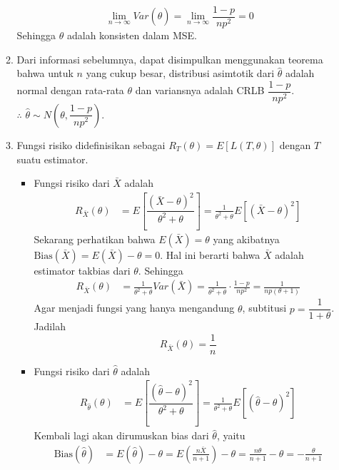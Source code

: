 \documentclass{exam}
\begin{document}
\begin{enumerate}
\begin{solution}
\begin{enumerate}
            \[\lim_{n\to\infty}Var(\hat{\theta}) = \lim_{n\to\infty}\frac{1-p}{np^2} = 0\]
            Sehingga $\hat{\theta}$ adalah konsisten dalam MSE.
            \item Dari informasi sebelumnya, dapat disimpulkan menggunakan teorema bahwa untuk $n$ yang cukup besar, distribusi asimtotik dari $\hat{\theta}$ adalah normal dengan rata-rata $\theta$ dan variansnya adalah CRLB $\dfrac{1-p}{np^2}$.\\
            $\therefore$ $\hat{\theta}\sim N\left(\theta,\dfrac{1-p}{np^2}\right)$.
            \item Fungsi risiko didefinisikan sebagai $R_{T}(\theta) = E\left[L(T,\theta)\right]$ dengan $T$ suatu estimator. 
            \begin{itemize}
                \item Fungsi risiko dari $\bar{X}$ adalah
                \begin{align*}
                    R_{\bar{X}}(\theta) &= E\left[\dfrac{(\bar{X}-\theta)^2}{\theta^2+\theta}\right] = \frac{1}{\theta^2+\theta}E\left[\left(\bar{X}-\theta\right)^2\right] 
                \end{align*}
                Sekarang perhatikan bahwa $E(\bar{X}) = \theta$ yang akibatnya $\text{Bias}(\bar{X}) = E(\bar{X}) - \theta = 0$. Hal ini berarti bahwa $\bar{X}$ adalah estimator takbias dari $\theta$. Sehingga
                \begin{align*}
                    R_{\bar{X}}(\theta) &= \frac{1}{\theta^2+\theta}Var(\bar{X}) = \frac{1}{\theta^2+\theta}\cdot\frac{1-p}{np^2}= \frac{1}{np(\theta+1)}
                \end{align*}
                Agar menjadi fungsi yang hanya mengandung $\theta$, subtitusi $p=\dfrac{1}{1+\theta}$. Jadilah
                \[R_{\bar{X}}(\theta) = \frac{1}{n}\]
                \item Fungsi risiko dari $\hat{\theta}$ adalah
                \begin{align*}
                    R_{\hat{\theta}}(\theta) &= E\left[\dfrac{(\hat{\theta}-\theta)^2}{\theta^2+\theta}\right] = \frac{1}{\theta^2+\theta}E\left[\left(\hat{\theta}-\theta\right)^2\right]
                \end{align*}
                Kembali lagi akan dirumuskan bias dari $\hat{\theta}$, yaitu
                \begin{align*}
                    \text{Bias}(\hat{\theta}) &= E(\hat{\theta}) - \theta = E\left(\frac{n\bar{X}}{n+1}\right) - \theta = \frac{n\theta}{n+1} - \theta = -\frac{\theta}{n+1}

\end{align*}
\end{itemize}
\end{enumerate}
\end{solution}
\end{enumerate}
\end{document}

